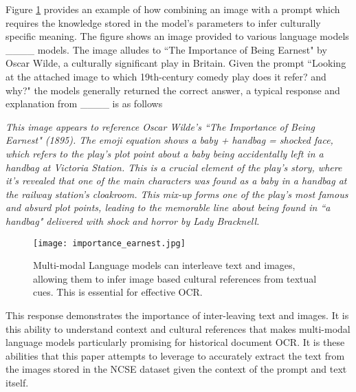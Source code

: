 Figure \ref{fig:importance_earnest} provides an example of how combining an image with a prompt which requires the knowledge stored in the model's parameters to infer culturally specific meaning. The figure shows an image provided to various language models ____ models. The image alludes to ``The Importance of Being Earnest" by Oscar Wilde, a culturally significant play in Britain. Given the prompt ``Looking at the attached image to which 19th-century comedy play does it refer? and why?" the models generally returned the correct answer, a typical response and explanation from ____ is as follows\newline

\textit{This image appears to reference Oscar Wilde's ``The Importance of Being Earnest" (1895). The emoji equation shows a baby + handbag = shocked face, which refers to the play's plot point about a baby being accidentally left in a handbag at Victoria Station. This is a crucial element of the play's story, where it's revealed that one of the main characters was found as a baby in a handbag at the railway station's cloakroom. This mix-up forms one of the play's most famous and absurd plot points, leading to the memorable line about being found in ``a handbag" delivered with shock and horror by Lady Bracknell.}
\newline

\begin{figure}
    \centering
    \texttt{[image: importance\_earnest.jpg]}
    \caption{Multi-modal Language models can interleave text and images, allowing them to infer image based cultural references from textual cues. This is essential for effective OCR. }
    \label{fig:importance_earnest}
\end{figure}


This response demonstrates the importance of inter-leaving text and images. It is this ability to understand context and cultural references that makes multi-modal language models particularly promising for historical document OCR. It is these abilities that this paper attempts to leverage to accurately extract the text from the images stored in the NCSE dataset given the context of the prompt and text itself.